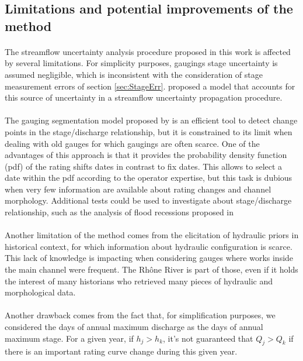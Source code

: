 \documentclass[11pt]{article}
\begin{document}
    
    \subsection{Limitations and potential improvements of the method}
    \paragraph{}
    The streamflow uncertainty analysis procedure proposed in this work is affected by several limitations. For simplicity purposes, gaugings stage uncertainty is assumed negligible, which is inconsistent with the consideration of stage measurement errors of section \ref{sec:StageErr}. \citet{horner_impact_2018} proposed a model that accounts for this source of uncertainty in a streamflow uncertainty propagation procedure.  
    \paragraph{}
    The gauging segmentation model proposed by \citet{darienzo_detection_2021} is an efficient tool to detect change points in the stage/discharge relationship, but it is constrained to its limit when dealing with old gauges for which gaugings are often scarce. One of the advantages of this approach is that it provides the probability density function (pdf) of the rating shifts dates in contrast to fix dates. This allows to select a date within the pdf according to the operator expertise, but this task is dubious when very few information are available about rating changes and channel morphology. Additional tests could be used to investigate about stage/discharge relationship, such as the analysis of flood recessions proposed in \citet{darienzo_detection_2021-1}
    \paragraph{}
    Another limitation of the method comes from the elicitation of hydraulic priors in historical context, for which information about hydraulic configuration is scarce. This lack of knowledge is impacting when considering gauges where works inside the main channel were frequent. The Rhône River is part of those, even if it holds the interest of many historians who retrieved many pieces of hydraulic and morphological data. 
    \paragraph{}
    Another drawback comes from the fact that, for simplification purposes, we considered the days of annual maximum discharge as the days of annual maximum stage. For a given year, if $h_{j} > h_{k}$, it's not guaranteed that $Q_{j} > Q_{k}$ if there is an important rating curve change during this given year. 
\end{document}
